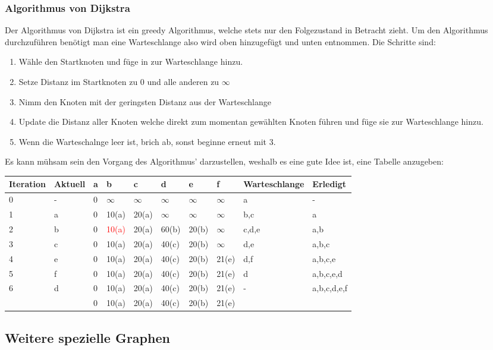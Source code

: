 \documentclass{article}
\begin{document}
	\subsubsection{Algorithmus von Dijkstra}
	Der Algorithmus von Dijkstra ist ein greedy Algorithmus, welche stets nur den Folgezustand in Betracht zieht. Um den Algorithmus durchzuführen benötigt man eine Warteschlange also wird oben hinzugefügt und unten entnommen. Die Schritte sind:
	\begin{enumerate}
		\item{Wähle den Startknoten und füge in zur Warteschlange hinzu.}
		\item{Setze Distanz im Startknoten zu 0 und alle anderen zu $\infty$}
		\item{Nimm den Knoten mit der geringsten Distanz aus der Warteschlange}
		\item{Update die Distanz aller Knoten welche direkt zum momentan gewählten Knoten führen und füge sie zur Warteschlange hinzu.}
		\item{Wenn die Warteschalnge leer ist, brich ab, sonst beginne erneut mit 3.}
	\end{enumerate}
	Es kann mühsam sein den Vorgang des Algorithmus' darzustellen, weshalb es eine gute Idee ist, eine Tabelle anzugeben:
	\begin{tabular}{| l | l | l | l | l | l | l | l | l | l |}
		\toprule
		Iteration & Aktuell & a & b & c & d & e & f & Warteschlange & Erledigt \\ \midrule
		0 & - & 0 & $\infty$ & $\infty$ & $\infty$ & $\infty$ & $\infty$ & a & - \\ \hline
		1 & a & 0 & 10(a) & 20(a) & $\infty$ & $\infty$ & $\infty$ & b,c & a \\ \hline
		2 & b & 0 & \textcolor{red}{10(a)} & 20(a) & 60(b) & 20(b) & $\infty$ & c,d,e & a,b \\ \hline
		3 & c & 0 & 10(a) & 20(a) & 40(c) & 20(b) & $\infty$ & d,e & a,b,c \\ \hline
		4 & e & 0 & 10(a) & 20(a) & 40(c) & 20(b) & 21(e) & d,f & a,b,c,e \\ \hline
		5 & f & 0 & 10(a) & 20(a) & 40(c) & 20(b) & 21(e) & d & a,b,c,e,d \\ \hline
		6 & d & 0 & 10(a) & 20(a) & 40(c) & 20(b) & 21(e) & - & a,b,c,d,e,f \\ \midrule
		& & 0 & 10(a) & 20(a) & 40(c) & 20(b) & 21(e) & & \\
		\bottomrule
	\end{tabular}
	\subsection{Weitere spezielle Graphen}
\end{document}

